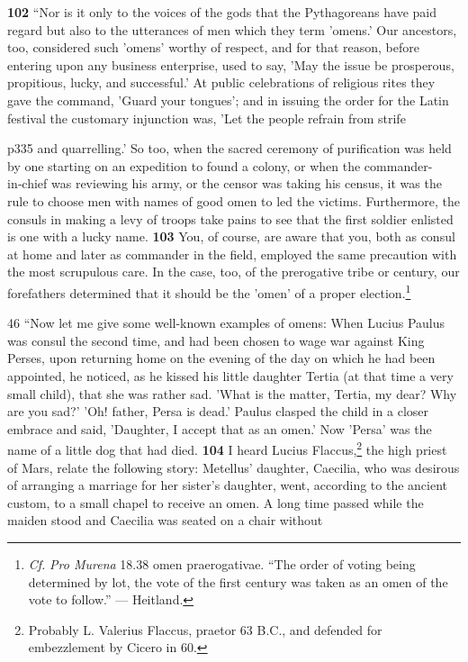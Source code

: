 \textbf{102} ``Nor is it only to the voices of the gods that the Pythagoreans have paid regard but also to the utterances of men which they term 'omens.' Our ancestors, too, considered such 'omens' worthy of respect, and for that reason, before entering upon any business enterprise, used to say, 'May the issue be prosperous, propitious, lucky, and successful.' At public celebrations of religious rites they gave the command, 'Guard your tongues'; and in issuing the order for the Latin festival the customary injunction was, 'Let the people refrain from strife

p335 and quarrelling.' So too, when the sacred ceremony of purification was held by one starting on an expedition to found a colony, or when the commander-in\texthebrew{‑}chief was reviewing his army, or the censor was taking his census, it was the rule to choose men with names of good omen to led the victims. Furthermore, the consuls in making a levy of troops take pains to see that the first soldier enlisted is one with a lucky name. \textbf{103} You, of course, are aware that you, both as consul at home and later as commander in the field, employed the same precaution with the most scrupulous care. In the case, too, of the prerogative tribe or century, our forefathers determined that it should be the 'omen' of a proper election.\footnote{\emph{Cf.} \emph{Pro Murena} 18.38 omen praerogativae. ``The order of voting being determined by lot, the vote of the first century was taken as an omen of the vote to follow.'' \texthebrew{—} Heitland.

}

46
``Now let me give some well-known examples of omens: When Lucius Paulus was consul the second time, and had been chosen to wage war against King Perses, upon returning home on the evening of the day on which he had been appointed, he noticed, as he kissed his little daughter Tertia (at that time a very small child), that she was rather sad. 'What is the matter, Tertia, my dear? Why are you sad?' 'Oh! father, Persa is dead.' Paulus clasped the child in a closer embrace and said, 'Daughter, I accept that as an omen.' Now 'Persa' was the name of a little dog that had died. \textbf{104} I heard Lucius Flaccus,\texthebrew{}\footnote{Probably L. Valerius Flaccus, praetor 63 B.C., and defended for embezzlement by Cicero in 60.

} the high priest of Mars, relate the following story: Metellus' daughter, Caecilia, who was desirous of arranging a marriage for her sister's daughter, went, according to the ancient custom, to a small chapel to receive an omen. A long time passed while the maiden stood and Caecilia was seated on a chair without

